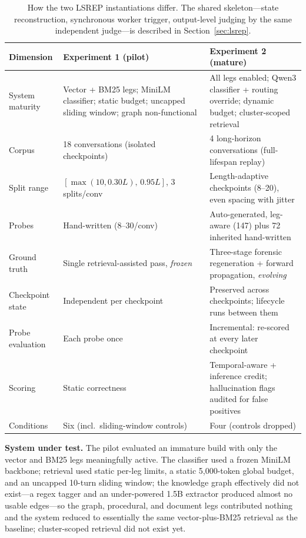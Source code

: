 \documentclass[11pt,a4paper]{article}
\begin{document}
\begin{table}[htbp]
\centering
\small
\caption{How the two LSREP instantiations differ. The shared skeleton---state reconstruction, synchronous worker trigger, output-level judging by the same independent judge---is described in Section~\ref{sec:lsrep}.}
\label{tab:exp-diff}
\begin{tabular}{@{}L{2.8cm}L{4.6cm}L{4.6cm}@{}}
\toprule
\textbf{Dimension} & \textbf{Experiment 1 (pilot)} & \textbf{Experiment 2 (mature)} \\
\midrule
System maturity & Vector + BM25 legs; MiniLM classifier; static budget; uncapped sliding window; graph non-functional & All legs enabled; Qwen3 classifier + routing override; dynamic budget; cluster-scoped retrieval \\
Corpus & 18 conversations (isolated checkpoints) & 4 long-horizon conversations (full-lifespan replay) \\
Split range & $[\max(10,0.30L),\,0.95L]$, 3 splits/conv & Length-adaptive checkpoints (8--20), even spacing with jitter \\
Probes & Hand-written (8--30/conv) & Auto-generated, leg-aware (147) plus 72 inherited hand-written \\
Ground truth & Single retrieval-assisted pass, \emph{frozen} & Three-stage forensic regeneration + forward propagation, \emph{evolving} \\
Checkpoint state & Independent per checkpoint & Preserved across checkpoints; lifecycle runs between them \\
Probe evaluation & Each probe once & Incremental: re-scored at every later checkpoint \\
Scoring & Static correctness & Temporal-aware + inference credit; hallucination flags audited for false positives \\
Conditions & Six (incl.\ sliding-window controls) & Four (controls dropped) \\
\bottomrule
\end{tabular}
\end{table}

\textbf{System under test.} The pilot evaluated an immature build with only the vector and BM25 legs meaningfully active. The classifier used a frozen MiniLM backbone; retrieval used static per-leg limits, a static 5{,}000-token global budget, and an uncapped 10-turn sliding window; the knowledge graph effectively did not exist---a regex tagger and an under-powered 1.5B extractor produced almost no usable edges---so the graph, procedural, and document legs contributed nothing and the system reduced to essentially the same vector-plus-BM25 retrieval as the baseline; cluster-scoped retrieval did not exist yet.
\end{document}
